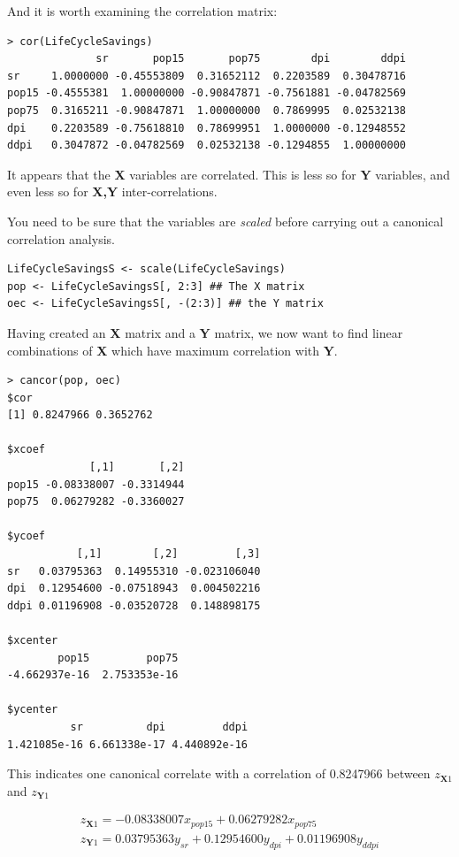 And it is worth examining the correlation matrix:

\singlespacing
\begin{verbatim}
> cor(LifeCycleSavings)
              sr       pop15       pop75        dpi        ddpi
sr     1.0000000 -0.45553809  0.31652112  0.2203589  0.30478716
pop15 -0.4555381  1.00000000 -0.90847871 -0.7561881 -0.04782569
pop75  0.3165211 -0.90847871  1.00000000  0.7869995  0.02532138
dpi    0.2203589 -0.75618810  0.78699951  1.0000000 -0.12948552
ddpi   0.3047872 -0.04782569  0.02532138 -0.1294855  1.00000000
\end{verbatim}
\onehalfspacing

It appears that the \textbf{X} variables are correlated.   This is less so for \textbf{Y} variables, and even less so for \textbf{X,Y} inter-correlations.

You need to be sure that the variables are \emph{scaled} before carrying out a canonical correlation analysis.   

\singlespacing
\begin{verbatim}
LifeCycleSavingsS <- scale(LifeCycleSavings)
pop <- LifeCycleSavingsS[, 2:3] ## The X matrix
oec <- LifeCycleSavingsS[, -(2:3)] ## the Y matrix
\end{verbatim}
\onehalfspacing

Having created an \textbf{X} matrix and a \textbf{Y} matrix, we now want to find linear combinations of \textbf{X} which have maximum correlation with \textbf{Y}.

\singlespacing
\begin{verbatim}
> cancor(pop, oec)
$cor
[1] 0.8247966 0.3652762

$xcoef
             [,1]       [,2]
pop15 -0.08338007 -0.3314944
pop75  0.06279282 -0.3360027

$ycoef
           [,1]        [,2]         [,3]
sr   0.03795363  0.14955310 -0.023106040
dpi  0.12954600 -0.07518943  0.004502216
ddpi 0.01196908 -0.03520728  0.148898175

$xcenter
        pop15         pop75 
-4.662937e-16  2.753353e-16 

$ycenter
          sr          dpi         ddpi 
1.421085e-16 6.661338e-17 4.440892e-16 
\end{verbatim}
\onehalfspacing

This indicates one canonical correlate with a correlation of 0.8247966 between $z_{\boldsymbol{X}1}$ and $z_{\boldsymbol{Y}1}$

\begin{eqnarray}
z_{\boldsymbol{X}1} =  -0.08338007  x_{pop15} + 0.06279282 x_{pop75}\\
z_{\boldsymbol{Y}1} = 0.03795363 y_{sr} + 0.12954600 y_{dpi} +  0.01196908 y_{ddpi}
\end{eqnarray}

